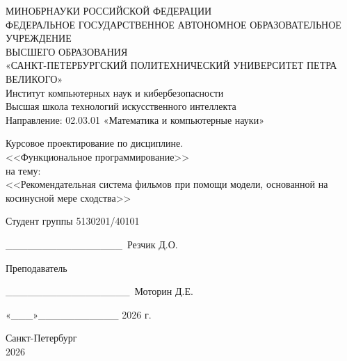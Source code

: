 \thispagestyle{empty}
\begin{center}
{\large 
МИНОБРНАУКИ РОССИЙСКОЙ ФЕДЕРАЦИИ \\ФЕДЕРАЛЬНОЕ ГОСУДАРСТВЕННОЕ  
АВТОНОМНОЕ ОБРАЗОВАТЕЛЬНОЕ УЧРЕЖДЕНИЕ \\ ВЫСШЕГО ОБРАЗОВАНИЯ \\ \vspace{7pt} «САНКТ-ПЕТЕРБУРГСКИЙ ПОЛИТЕХНИЧЕСКИЙ УНИВЕРСИТЕТ ПЕТРА ВЕЛИКОГО»\\ \vspace{7pt} Институт компьютерных наук и кибербезопасности\\ \vspace{4pt} Высшая школа технологий искусственного интеллекта\\ \vspace{4pt} Направление: 02.03.01 «Математика и компьютерные науки»

\vspace{100pt}
Курсовое проектирование по дисциплине. \\ <<Функциональное программирование>> \\ на тему: \\ <<Рекомендательная система фильмов при помощи модели, основанной на косинусной мере сходства>>

}
\end{center}

\vspace{70pt}
\noindent Студент группы 5130201/40101 \vspace{-20pt}\begin{flushright} \_\!\_\!\_\!\_\!\_\!\_\!\_\!\_\!\_\!\_\!\_\!\_\!\_\!\_\!\_\!\_\!\ Резчик Д.О.
\end{flushright} \par

\noindent Преподаватель\vspace{-25pt}\begin{flushright} \_\!\_\!\_\!\_\!\_\!\_\!\_\!\_\!\_\!\_\!\_\!\_\!\_\!\_\!\_\!\_\!\_\ Моторин Д.Е. \end{flushright}

\vspace{70pt}
\begin{flushright}
    «\_\!\_\!\_»\_\!\_\!\_\!\_\!\_\!\_\!\_\!\_\!\_\!\_\!\_ 2026 г.
\end{flushright}

\vspace{35pt}
\begin{center}
Санкт-Петербург \\ 2026
\end{center}
\newpage